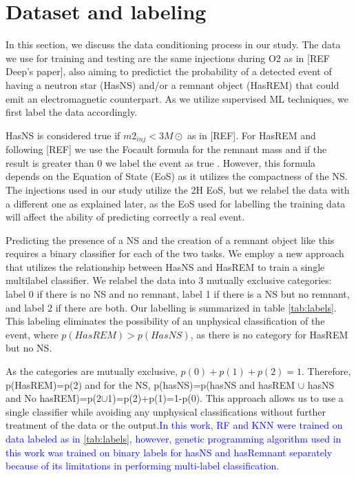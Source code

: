 \section{Dataset and labeling}
\label{sec:dataset}
In this section, we discuss the data conditioning process in our study. The data we use for training and testing are the same injections during O2 as in  [REF Deep's paper], also aiming to predictict the probability of a detected event of having a neutron star (HasNS) and/or a remnant object (HasREM) that could emit an electromagnetic counterpart. As we utilize supervised ML techniques, we first label the data accordingly.

HasNS is considered true if $m2_{inj}< 3M\odot$ as in [REF]. For HasREM and following [REF] we use the Focault formula for the remnant mass and if the result is greater than 0 we label the event as true . However, this formula depends on the Equation of State (EoS) as it utilizes the compactness of the NS. The injections used in our study utilize the 2H EoS, but we relabel the data with a different one as explained later, as the EoS used for labelling the training data will affect the ability of predicting correctly a real event.

Predicting the presence of a NS and the creation of a remnant object like this requires a binary classifier for each of the two tasks. We employ a new approach that utilizes the relationship between HasNS and HasREM to train a single multilabel classifier. We relabel the data into 3 mutually exclusive categories: label 0 if there is no NS and no remnant, label 1 if there is a NS but no remnant, and label 2 if there are both. Our labelling is summarized in table \ref{tab:labels}. This labeling eliminates the possibility of an unphysical classification of the event, where $p(HasREM)>p(HasNS)$, as there is no category for HasREM but no NS.

As the categories are mutually exclusive, $p(0)+p(1)+p(2)=1$. Therefore, p(HasREM)=p(2) and for the NS, p(hasNS)=p(hasNS and hasREM $\cup$ hasNS and No hasREM)=p(2$\cup$1)=p(2)+p(1)=1-p(0). This approach allows us to use a single classifier while avoiding any unphysical classifications without further treatment of the data or the output.\textcolor{blue}{In this work, RF and KNN were trained on data labeled as in \ref{tab:labels}, however, genetic programming algorithm used in this work was trained on binary labels for hasNS and hasRemnant separately because of its limitations in performing multi-label classification}.

